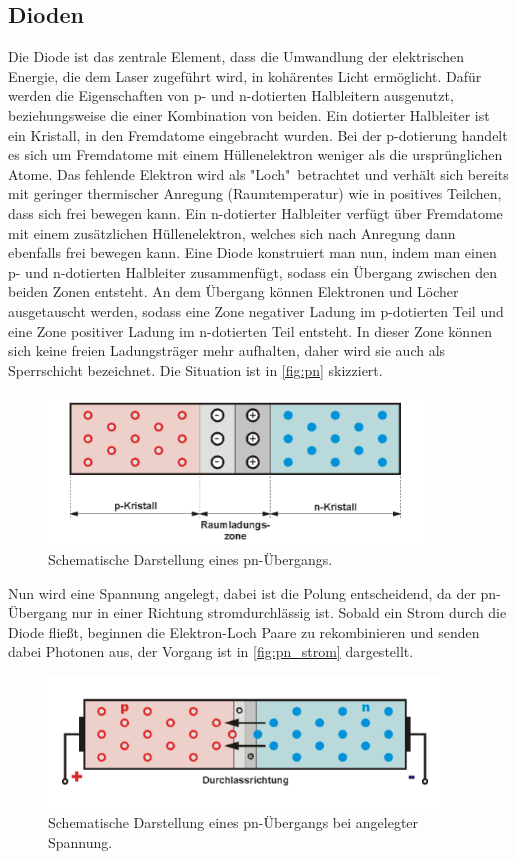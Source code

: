 \subsection{Dioden}
Die Diode ist das zentrale Element, dass die Umwandlung der elektrischen Energie, die dem Laser zugeführt wird, in
kohärentes Licht ermöglicht.
Dafür werden die Eigenschaften von p- und n-dotierten Halbleitern ausgenutzt, beziehungsweise die einer Kombination von beiden.
Ein dotierter Halbleiter ist ein Kristall, in den Fremdatome eingebracht wurden. Bei der p-dotierung handelt es sich um
Fremdatome mit einem Hüllenelektron weniger als die ursprünglichen Atome. Das fehlende Elektron wird als "Loch"\, betrachtet
und verhält sich bereits mit geringer thermischer Anregung (Raumtemperatur) wie in positives Teilchen, dass sich frei bewegen kann.
Ein n-dotierter Halbleiter verfügt über Fremdatome mit einem zusätzlichen Hüllenelektron, welches sich nach Anregung dann ebenfalls frei
bewegen kann.
Eine Diode konstruiert man nun, indem man einen p- und n-dotierten Halbleiter zusammenfügt, sodass ein Übergang zwischen den
beiden Zonen entsteht. An dem Übergang können Elektronen und Löcher ausgetauscht werden, sodass eine Zone negativer Ladung
im p-dotierten Teil und eine Zone positiver Ladung im n-dotierten Teil entsteht.
In dieser Zone können sich keine freien Ladungsträger mehr aufhalten, daher wird sie auch als Sperrschicht bezeichnet.
Die Situation ist in \autoref{fig:pn} skizziert.
\begin{figure}[H]
    \centering
    \includegraphics[height=4cm]{content/pics/pn_uebergang.png}
    \caption{Schematische Darstellung eines pn-Übergangs. \cite{pn_uebergang}}
    \label{fig:pn}
\end{figure}
Nun wird eine Spannung angelegt, dabei ist die Polung entscheidend, da der pn-Übergang nur in einer Richtung stromdurchlässig ist.
Sobald ein Strom durch die Diode fließt, beginnen die Elektron-Loch Paare zu rekombinieren und senden dabei Photonen aus, der
Vorgang ist in \autoref{fig:pn_strom} dargestellt.
\begin{figure}[H]
    \centering
    \includegraphics[height=3.5cm]{content/pics/pn_strom.png}
    \caption{Schematische Darstellung eines pn-Übergangs bei angelegter Spannung. \cite{pn_uebergang}}
    \label{fig:pn_strom}
\end{figure}
